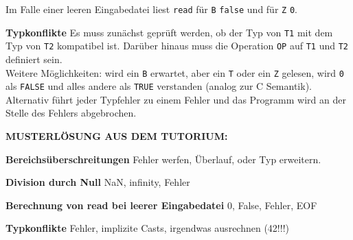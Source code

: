 \documentclass[ngerman,a4paper]{report}
\begin{document}
\begin{compactenum}
	Im Falle einer leeren Eingabedatei liest \lstinline!read! für \lstinline!B! \lstinline!false! und für \lstinline!Z! \lstinline!0!.\\
\item [\textbf{Typkonflikte}] Es muss zunächst geprüft werden, ob der Typ von \lstinline!T1! mit dem Typ von \lstinline!T2! kompatibel ist. Darüber hinaus muss die Operation \lstinline!OP! auf \lstinline!T1! und \lstinline!T2! definiert sein.\\
Weitere Möglichkeiten: wird ein \lstinline!B! erwartet, aber ein \lstinline!T! oder ein \lstinline!Z! gelesen, wird \lstinline!0! als \lstinline!FALSE! und alles andere als \lstinline!TRUE! verstanden (analog zur C Semantik). Alternativ führt jeder Typfehler zu einem Fehler und das Programm wird an der Stelle des Fehlers abgebrochen.\\
\end{compactenum}

\textbf{MUSTERLÖSUNG AUS DEM TUTORIUM:}\\
\begin{compactitem}
	\item [\textbf{Bereichsüberschreitungen}] Fehler werfen, Überlauf, oder Typ erweitern.
	\item [\textbf{Division durch Null}] NaN, infinity, Fehler
	\item [\textbf{Berechnung von read bei leerer Eingabedatei}] 0, False, Fehler, EOF
	\item [\textbf{Typkonflikte}] Fehler, implizite Casts, irgendwas ausrechnen (42!!!)
\end{compactitem}
\end{document}
